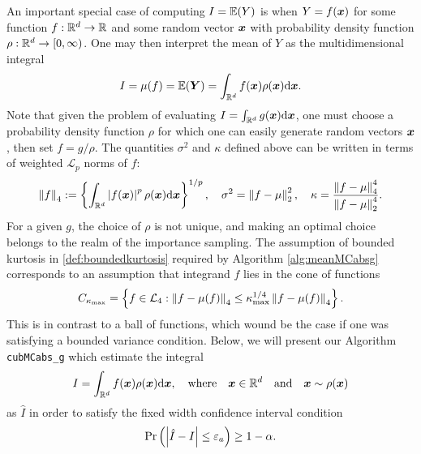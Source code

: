 \documentclass{iitthesis}
\theoremstyle{definition}
\begin{document}
An important special case of computing $I =\e(Y)$ is when $Y = f(\vx)$ for some function $f:\reals^d \to \reals$ and some random vector $\vx$ with probability density function $\rho: \reals^d \to [0,\infty)$. One may then interpret the mean of $Y$ as the multidimensional integral
\begin{align*}
I= \mu(f) = \e(\vY) = \int_{\reals^d}f(\boldsymbol{x})\rho(\vx)\dif \vx.
\end{align*}
Note that given the problem of evaluating $I = \int_{\reals^d}g(\vx)\dif\vx$, one must choose a probability density function $\rho$ for which one can easily generate random vectors $\vx$, then set $f = g/\rho$. The quantities $\sigma^2$ and $\kappa$ defined above can be written in terms of weighted $\mathcal{L}_p$ norms of $f$:
\begin{align*}
\norm[4]{f}:=\left\{ \int_{\reals^d}\abs{f(\vx)}^p\rho(\vx)\dif\vx\right\}^{1/p}, \quad \sigma^2 = \norm[2]{f-\mu}^2,\quad \kappa = \frac{\norm[4]{f-\mu}^4}{\norm[2]{f-\mu}^4}.
\end{align*}
For a given $g$, the choice of $\rho$ is not unique, and making an optimal choice belongs to the realm of the importance sampling. The assumption of bounded kurtosis in \eqref{def:boundedkurtosis} required by Algorithm \ref{alg:meanMCabsg} corresponds to an assumption that integrand $f$ lies in the cone of functions \cite{CDHHZ13}
\begin{align*}
C_{\kmax} = \left\{ f \in \mathcal{L}_4: \norm[4]{f-\mu(f)} \leq \kmax^{1/4} \norm[4]{f-\mu(f)}\right\}.
\end{align*}
This is in contrast to a ball of functions, which wound be the case if one was satisfying a bounded variance condition.
Below, we will present our Algorithm {\tt cubMCabs\_g} which estimate the integral
$$I = \int_{\reals^d} f(\vx)\rho(\vx)\dif\vx, \quad \text{where}\quad \vx \in \reals^d \quad \text{and}\quad  \vx \sim \rho(\vx)$$
as $\hat{I}$ in order to satisfy the fixed width confidence interval condition
\begin{align}\label{cubMCabsgCI}
\Pr \left(\abs{\hat{I}-I} \leq \varepsilon_a \right) \geq 1-\alpha.
\end{align}

\label{sec:cubMCabsg}
\end{document}
